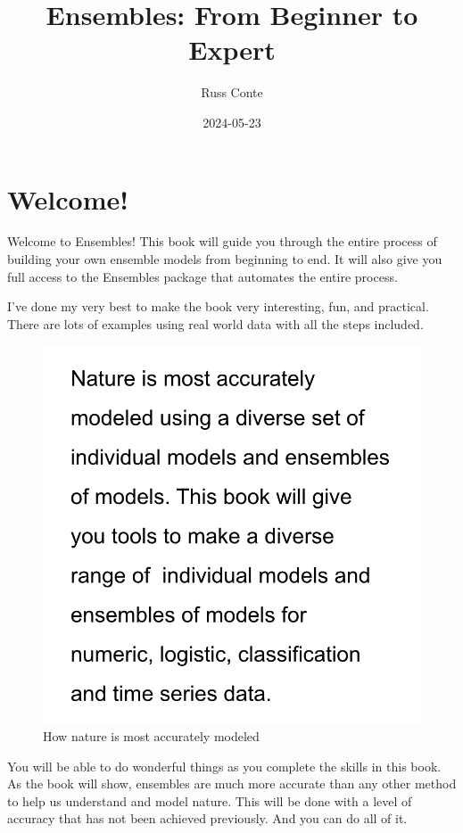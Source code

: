 \documentclass[
]{book}
\title{Ensembles: From Beginner to Expert}
\author{Russ Conte}
\date{2024-05-23}
\begin{document}
\maketitle

{
\setcounter{tocdepth}{1}
\tableofcontents
}
\chapter{Welcome!}\label{welcome}

Welcome to Ensembles! This book will guide you through the entire process of building your own ensemble models from beginning to end. It will also give you full access to the Ensembles package that automates the entire process.

I've done my very best to make the book very interesting, fun, and practical. There are lots of examples using real world data with all the steps included.

\begin{figure}
\centering
\includegraphics{_book/images/Nature_is_most_accurately_modeled.jpg}
\caption{How nature is most accurately modeled}
\end{figure}

You will be able to do wonderful things as you complete the skills in this book. As the book will show, ensembles are much more accurate than any other method to help us understand and model nature. This will be done with a level of accuracy that has not been achieved previously. And you can do all of it.
\end{document}
